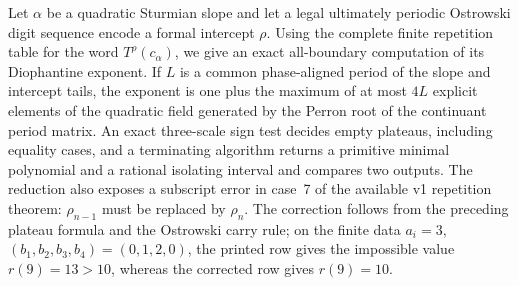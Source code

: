 Let $\alpha$ be a quadratic Sturmian slope and let a legal ultimately
periodic Ostrowski digit sequence encode a formal intercept $\rho$.  Using the
complete finite repetition table for the word $T^\rho(c_\alpha)$, we give an
exact all-boundary computation of its Diophantine exponent.  If $L$ is a common
phase-aligned period of the slope and intercept tails, the exponent is one plus
the maximum of at most $4L$ explicit elements of the quadratic field generated
by the Perron root of the continuant period matrix.  An exact three-scale sign
test decides empty plateaus, including equality cases, and a terminating
algorithm returns a primitive minimal polynomial and a rational isolating
interval and compares two outputs.  The reduction also exposes a subscript
error in case~7 of the available v1 repetition theorem: $\rho_{n-1}$ must be
replaced by $\rho_n$.  The correction follows from the preceding plateau
formula and the Ostrowski carry rule; on the finite data
$a_i=3$, $(b_1,b_2,b_3,b_4)=(0,1,2,0)$, the printed row gives the impossible
value $r(9)=13>10$, whereas the corrected row gives $r(9)=10$.

